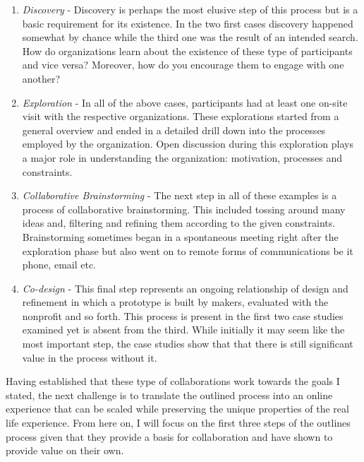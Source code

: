 \begin{enumerate}

\item \textit{Discovery} - Discovery is perhaps the most elusive step of this process but is a basic requirement for its existence. In the two first cases discovery happened somewhat by chance while the third one was the result of an intended search. How do organizations learn about the existence of these type of participants and vice versa? Moreover, how do you encourage them to engage with one another? 

\item \textit{Exploration} - In all of the above cases, participants had at least one on-site visit with the respective organizations. These explorations started from a general overview and ended in a detailed drill down into the processes employed by the organization. Open discussion during this exploration plays a major role in understanding the organization: motivation, processes and constraints. 

\item \textit{Collaborative Brainstorming} - The next step in all of these examples is a process of collaborative brainstorming. This included tossing around many ideas and, filtering and refining them according to the given constraints. Brainstorming sometimes began in a spontaneous meeting right after the exploration phase but also went on to remote forms of communications be it phone, email etc.

\item \textit{Co-design} - This final step represents an ongoing relationship of design and refinement in which a prototype is built by makers, evaluated with the nonprofit and so forth. This process is present in the first two case studies examined yet is absent from the third. While initially it may seem like the most important step, the case studies show that that there is still significant value in the process without it. 

\end{enumerate}
 
Having established that these type of collaborations work towards the goals I stated, the next challenge is to translate the outlined process into an online experience that can be scaled while preserving the unique properties of the real life experience. From here on, I will focus on the first three steps of the outlines process given that they provide a basis for collaboration and have shown to provide value on their own.